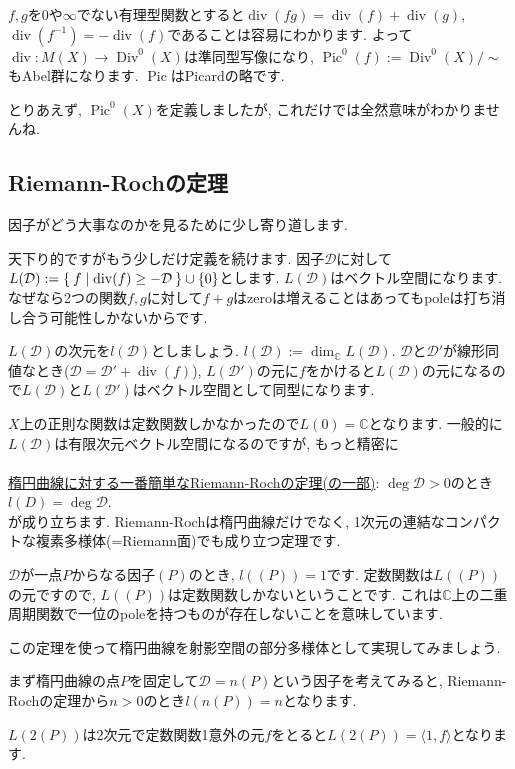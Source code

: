 \documentclass{jsarticle}
\newcommand{\CC}{\mathbb{C}}
\newcommand{\makeop}[1]{\mathop{\mathrm{#1}}\nolimits}
\def\Pic{\makeop{Pic}}
\def\Div{\makeop{Div}}
\def\div{\makeop{div}}
\theoremstyle{definition}
\numberwithin{theorem}{section}
\begin{document}
$f, g$を0や$\infty$でない有理型関数とすると$\div(fg) = \div(f) + \div(g)$, $\div(f^{-1}) = -\div(f)$であることは容易にわかります. よって $\div: M(X) \rightarrow \Div^0(X)$は準同型写像になり, $\Pic^0(f) := \Div^0(X)/\sim$もAbel群になります. $\Pic$はPicardの略です. 

とりあえず, $\Pic^0(X)$を定義しましたが, これだけでは全然意味がわかりませんね.

\subsection{Riemann-Rochの定理}
因子がどう大事なのかを見るために少し寄り道します.

天下り的ですがもう少しだけ定義を続けます. 因子$\mathcal{D}$に対して$L(\mathcal{D}) := \Set{f | \div(f) \geq -\mathcal{D}} \cup \{0\}$とします. $L(\mathcal{D})$はベクトル空間になります. なぜなら2つの関数$f, g$に対して$f+g$はzeroは増えることはあってもpoleは打ち消し合う可能性しかないからです.

$L(\mathcal{D})$の次元を$l(\mathcal{D})$としましょう. $l(\mathcal{D}) := \dim_\CC L(\mathcal{D})$. $\mathcal{D}$と$\mathcal{D}'$が線形同値なとき($\mathcal{D} = \mathcal{D}' + \div(f)$), $L(\mathcal{D}')$の元に$f$をかけると$L(\mathcal{D})$の元になるので$L(\mathcal{D})$と$L(\mathcal{D}')$はベクトル空間として同型になります. 

$X$上の正則な関数は定数関数しかなかったので$L(0) = \CC$となります. 一般的に$L(\mathcal{D})$は有限次元ベクトル空間になるのですが, もっと精密に\\\\


\underline{楕円曲線に対する一番簡単なRiemann-Rochの定理(の一部)}: $\deg \mathcal{D} > 0$のとき$l(D) = \deg \mathcal{D}$.\\

が成り立ちます. Riemann-Rochは楕円曲線だけでなく, 1次元の連結なコンパクトな複素多様体(=Riemann面)でも成り立つ定理です. 

$\mathcal{D}$が一点$P$からなる因子$(P)$のとき, $l((P)) = 1$です. 定数関数は$L((P))$の元ですので, $L((P))$は定数関数しかないということです. これは$\CC$上の二重周期関数で一位のpoleを持つものが存在しないことを意味しています. 

この定理を使って楕円曲線を射影空間の部分多様体として実現してみましょう.

まず楕円曲線の点$P$を固定して$\mathcal{D} = n(P)$という因子を考えてみると, Riemann-Rochの定理から$n > 0$のとき$l(n(P)) = n$となります.

$L(2(P))$は2次元で定数関数1意外の元$f$をとると$L(2(P)) = \langle1, f\rangle$となります. 
\end{document}
